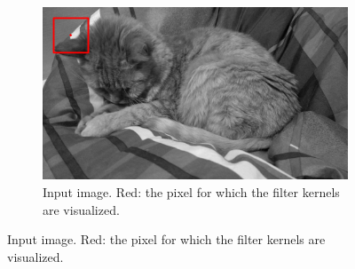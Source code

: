 \documentclass[a4spaper]{article}
\begin{document}
\begin{figure}[ht]
	\centering
	\begin{subfigure}[h]{0.8\textwidth}
		\centering
		\includegraphics[width=\textwidth]{jerry_kernel_input}
		\caption*{Input image. Red: the pixel for which the filter kernels are visualized.}
	\end{subfigure}
	

\end{figure}
\end{document}

